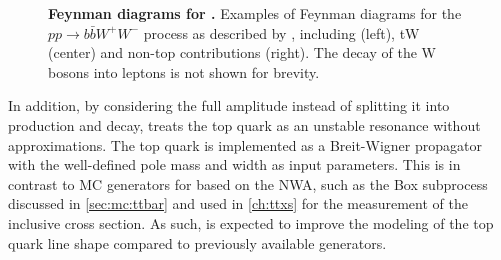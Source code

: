 \begin{figure}[t]
    \caption{\textbf{Feynman diagrams for \bbfourl.} Examples of Feynman diagrams for the $pp \to b \bar{b} W^+ W^-$ process as described by \bbfourl, including \ttbar (left), tW (center) and non-top contributions (right). The decay of the W bosons into leptons is not shown for brevity.}
    \label{fig:bb4l:feynman}
\end{figure}

In addition, by considering the full amplitude instead of splitting it into production and decay, \bbfourl treats the top quark as an unstable resonance without approximations. The top quark is implemented as a Breit-Wigner propagator with the well-defined pole mass and width as input parameters. This is in contrast to MC generators for \ttbar based on the NWA, such as the \powheg Box subprocess \hvq discussed in \cref{sec:mc:ttbar} and used in \cref{ch:ttxs} for the measurement of the inclusive \ttbar cross section. As such, \bbfourl is expected to improve the modeling of the top quark line shape compared to previously available generators.

